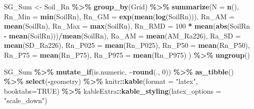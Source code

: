 \documentclass[
  12pt,
]{article}
\newenvironment{Shaded}{\begin{snugshade}}{\end{snugshade}}
\newcommand{\DataTypeTok}[1]{\textcolor[rgb]{0.13,0.29,0.53}{#1}}
\newcommand{\DecValTok}[1]{\textcolor[rgb]{0.00,0.00,0.81}{#1}}
\newcommand{\KeywordTok}[1]{\textcolor[rgb]{0.13,0.29,0.53}{\textbf{#1}}}
\newcommand{\NormalTok}[1]{#1}
\newcommand{\OperatorTok}[1]{\textcolor[rgb]{0.81,0.36,0.00}{\textbf{#1}}}
\newcommand{\OtherTok}[1]{\textcolor[rgb]{0.56,0.35,0.01}{#1}}
\newcommand{\StringTok}[1]{\textcolor[rgb]{0.31,0.60,0.02}{#1}}
\begin{document}
\begin{Shaded}
\begin{Highlighting}[]
\NormalTok{  SG\_Sum \textless{}{-}}\StringTok{ }\NormalTok{Soil\_Rn }\OperatorTok{\%\textgreater{}\%}\StringTok{ }
\StringTok{    }\KeywordTok{group\_by}\NormalTok{(Grid) }\OperatorTok{\%\textgreater{}\%}
\StringTok{    }\KeywordTok{summarize}\NormalTok{(}\DataTypeTok{N =} \KeywordTok{n}\NormalTok{(),}
              \DataTypeTok{Rn\_Min =} \KeywordTok{min}\NormalTok{(SoilRn),}
              \DataTypeTok{Rn\_GM =} \KeywordTok{exp}\NormalTok{(}\KeywordTok{mean}\NormalTok{(}\KeywordTok{log}\NormalTok{(SoilRn))),}
              \DataTypeTok{Rn\_AM =} \KeywordTok{mean}\NormalTok{(SoilRn),}
              \DataTypeTok{Rn\_Max =} \KeywordTok{max}\NormalTok{(SoilRn),}
              \DataTypeTok{Rn\_RMD =} \DecValTok{100} \OperatorTok{*}\StringTok{ }\KeywordTok{mean}\NormalTok{(}\KeywordTok{abs}\NormalTok{(SoilRn }\OperatorTok{{-}}\StringTok{ }\KeywordTok{mean}\NormalTok{(SoilRn)))}\OperatorTok{/}\KeywordTok{mean}\NormalTok{(SoilRn),}
              \DataTypeTok{Ra\_AM =} \KeywordTok{mean}\NormalTok{(AM\_Ra226),}
              \DataTypeTok{Ra\_SD =} \KeywordTok{mean}\NormalTok{(SD\_Ra226),}
              \DataTypeTok{Rn\_P025 =} \KeywordTok{mean}\NormalTok{(Rn\_P025),}
              \DataTypeTok{Rn\_P50 =} \KeywordTok{mean}\NormalTok{(Rn\_P50),}
              \DataTypeTok{Rn\_P75 =} \KeywordTok{mean}\NormalTok{(Rn\_P75),}
              \DataTypeTok{Rn\_P975 =} \KeywordTok{mean}\NormalTok{(Rn\_P975)}
\NormalTok{              ) }\OperatorTok{\%\textgreater{}\%}
\StringTok{    }\KeywordTok{ungroup}\NormalTok{()}

\NormalTok{  SG\_Sum }\OperatorTok{\%\textgreater{}\%}
\StringTok{    }\KeywordTok{mutate\_if}\NormalTok{(is.numeric, }\OperatorTok{\textasciitilde{}}\KeywordTok{round}\NormalTok{(., }\DecValTok{0}\NormalTok{)) }\OperatorTok{\%\textgreater{}\%}
\StringTok{    }\KeywordTok{as\_tibble}\NormalTok{() }\OperatorTok{\%\textgreater{}\%}
\StringTok{    }\KeywordTok{select}\NormalTok{(}\OperatorTok{{-}}\NormalTok{geometry) }\OperatorTok{\%\textgreater{}\%}\StringTok{ }
\StringTok{    }\NormalTok{knitr}\OperatorTok{::}\KeywordTok{kable}\NormalTok{(}\DataTypeTok{format =} \StringTok{"latex"}\NormalTok{, }\DataTypeTok{booktabs=}\OtherTok{TRUE}\NormalTok{) }\OperatorTok{\%\textgreater{}\%}\StringTok{ }
\StringTok{    }\NormalTok{kableExtra}\OperatorTok{::}\KeywordTok{kable\_styling}\NormalTok{(}\DataTypeTok{latex\_options =} \StringTok{"scale\_down"}\NormalTok{)}
\end{Highlighting}
\end{Shaded}
\end{document}
